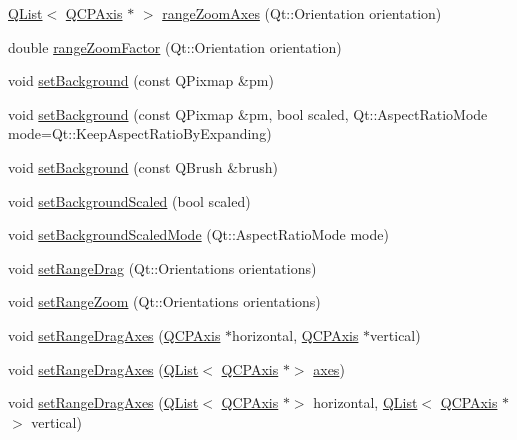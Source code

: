 \begin{DoxyCompactItemize}
\item 
\hyperlink{class_q_list}{Q\+List}$<$ \hyperlink{class_q_c_p_axis}{Q\+C\+P\+Axis} $\ast$ $>$ \hyperlink{class_q_c_p_axis_rect_a86aac0f435f209d60dacd22cda10c104}{range\+Zoom\+Axes} (Qt\+::\+Orientation orientation)
\item 
double \hyperlink{class_q_c_p_axis_rect_ae4e6c4d143aacc88d2d3c56f117c2fe1}{range\+Zoom\+Factor} (Qt\+::\+Orientation orientation)
\item 
void \hyperlink{class_q_c_p_axis_rect_af615ab5e52b8e0a9a0eff415b6559db5}{set\+Background} (const Q\+Pixmap \&pm)
\item 
void \hyperlink{class_q_c_p_axis_rect_ac48a2d5d9b7732e73b86605c69c5e4c1}{set\+Background} (const Q\+Pixmap \&pm, bool scaled, Qt\+::\+Aspect\+Ratio\+Mode mode=Qt\+::\+Keep\+Aspect\+Ratio\+By\+Expanding)
\item 
void \hyperlink{class_q_c_p_axis_rect_a22a22b8668735438dc06f9a55fe46b33}{set\+Background} (const Q\+Brush \&brush)
\item 
void \hyperlink{class_q_c_p_axis_rect_ae6d36c3e0e968ffb991170a018e7b503}{set\+Background\+Scaled} (bool scaled)
\item 
void \hyperlink{class_q_c_p_axis_rect_a5ef77ea829c9de7ba248e473f48f7305}{set\+Background\+Scaled\+Mode} (Qt\+::\+Aspect\+Ratio\+Mode mode)
\item 
void \hyperlink{class_q_c_p_axis_rect_ae6aef2f7211ba6097c925dcd26008418}{set\+Range\+Drag} (Qt\+::\+Orientations orientations)
\item 
void \hyperlink{class_q_c_p_axis_rect_a7960a9d222f1c31d558b064b60f86a31}{set\+Range\+Zoom} (Qt\+::\+Orientations orientations)
\item 
void \hyperlink{class_q_c_p_axis_rect_a648cce336bd99daac4a5ca3e5743775d}{set\+Range\+Drag\+Axes} (\hyperlink{class_q_c_p_axis}{Q\+C\+P\+Axis} $\ast$horizontal, \hyperlink{class_q_c_p_axis}{Q\+C\+P\+Axis} $\ast$vertical)
\item 
void \hyperlink{class_q_c_p_axis_rect_ab756bc5f129115fa3e8783617292fc1a}{set\+Range\+Drag\+Axes} (\hyperlink{class_q_list}{Q\+List}$<$ \hyperlink{class_q_c_p_axis}{Q\+C\+P\+Axis} $\ast$$>$ \hyperlink{class_q_c_p_axis_rect_a8db4722cb93e9c4a6f0d91150c200867}{axes})
\item 
void \hyperlink{class_q_c_p_axis_rect_ab767e659f952fd7cbf61faaf33feefc5}{set\+Range\+Drag\+Axes} (\hyperlink{class_q_list}{Q\+List}$<$ \hyperlink{class_q_c_p_axis}{Q\+C\+P\+Axis} $\ast$$>$ horizontal, \hyperlink{class_q_list}{Q\+List}$<$ \hyperlink{class_q_c_p_axis}{Q\+C\+P\+Axis} $\ast$$>$ vertical)
$$
\end{DoxyCompactItemize}
